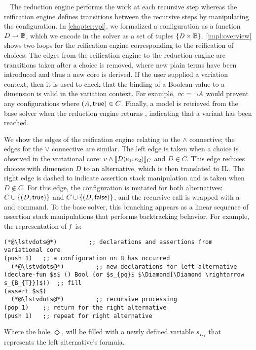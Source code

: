 ~\label{section:vsat:solving}
%
The reduction engine performs the work at each recursive step whereas the
reification engine defines transitions between the recursive steps by
manipulating the configuration. In \autoref{chapter:vpl}, we formalized
a configuration as a function $D\to\mathbb{B}{}$, which we encode in the solver
as a set of tuples $\{\mathit{D \times \mathbb{B}}\}$.
%
\autoref{impl:overview} shows two loops for the reification engine corresponding
to the reification of choices. The edges from the reification engine to the
reduction engine are transitions taken after a choice is removed, where new
plain terms have been introduced and thus a new core is derived. If the user
supplied a variation context, then it is used to check that the binding of a
Boolean value to a dimension is valid in the variation context. For example,
$\mathit{vc}_{} = \neg A$ would prevent any configurations where $\kf{(A,\true)} \in C$.
Finally, a model is retrieved from the base solver when the reduction engine
returns \unit{}, indicating that a variant has been reached.

We show the edges of the reification engine relating to the $\wedge$ connective;
the edges for the $\vee$ connective are similar. The left edge is taken when a
choice is observed in the variational core: $v \wedge \sem[C]{\chc[D]{e_{1},
    e_{2}}}$ and $D \in C$. This edge reduces choices with dimension $D$ to an
alternative, which is then translated to IL. The right edge is dashed to
indicate assertion stack manipulation and is taken when $D \notin C$. For this
edge, the configuration is mutated for both alternatives: $C \cup \{(D,
\true)\}$ and $C \cup \{(D, \false)\}$, and the recursive call is wrapped with a
 and  command. To the base solver, this branching appears as a
linear sequence of assertion stack manipulations that performs backtracking
behavior. For example, the representation of $\mathit{f}$ is:
%
\begin{lstlisting}[columns=flexible,keepspaces=true,language=SMTLIB]
  (*@\lstvdots@*)         ;; declarations and assertions from variational core
(push 1)   ;; a configuration on B has occurred
  (*@\lstvdots@*)         ;; new declarations for left alternative
(declare-fun $s$ () Bool (or $s_{pq}$ $\Diamond[\Diamond \rightarrow s_{B_{T}}]$))  ;; fill
(assert $s$)
  (*@\lstvdots@*)         ;; recursive processing
(pop 1)    ;; return for the right alternative
(push 1)   ;; repeat for right alternative
\end{lstlisting}
%
Where the hole $\Diamond$, will be filled with a newly defined variable
$s_{D_{T}}$ that represents the left alternative's formula.


